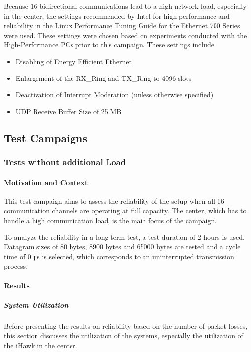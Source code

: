 Because 16 bidirectional communications lead to a high network load, especially in the center, the settings recommended by Intel for high performance and reliability in the Linux Performance Tuning Guide for the Ethernet 700 Series \cite{intermod03} were used. These settings were chosen based on experiments conducted with the High-Performance PCs prior to this campaign. These settings include:
\begin{itemize}
  \item Disabling of Energy Efficient Ethernet
  \item Enlargement of the RX\_Ring and TX\_Ring to 4096 slots
  \item Deactivation of Interrupt Moderation (unless otherwise specified)
  \item UDP Receive Buffer Size of 25 MB
\end{itemize}

\subsection{Test Campaigns}

\subsubsection{Tests without additional Load} \label{chap:noaddloadTest}
\paragraph{Motivation and Context}
This test campaign aims to assess the reliability of the setup when all 16 communication channels are operating at full capacity. The center, which has to handle a high communication load, is the main focus of the campaign.

To analyze the reliability in a long-term test, a test duration of 2 hours is used. Datagram sizes of 80 bytes, 8900 bytes and 65000 bytes are tested and a cycle time of 0 µs is selected, which corresponds to an uninterrupted transmission process.

\paragraph{Results}
\subparagraph{System Utilization}
Before presenting the results on reliability based on the number of packet losses, this section discusses the utilization of the systems, especially the utilization of the iHawk in the center.

